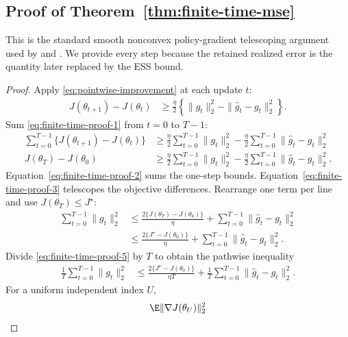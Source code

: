 \subsection{Proof of Theorem~\ref{thm:finite-time-mse}}

This is the standard smooth nonconvex policy-gradient telescoping argument used
by \citet{yuan2022general} and \citet{kallus2020efficient}.  We provide every
step because the retained realized error is the quantity later replaced by the
ESS bound.

\begin{proof}
Apply \eqref{eq:pointwise-improvement} at each update $t$:
\begin{align}
  J(\theta_{t+1})-J(\theta_t)
  &\ge\frac{\eta}{2}
    \left\{\|g_t\|_2^2-\|\widehat g_t-g_t\|_2^2\right\}.
    \label{eq:finite-time-proof-1}
\end{align}
Sum \eqref{eq:finite-time-proof-1} from $t=0$ to $T-1$:
\begin{align}
  \sum_{t=0}^{T-1}\{J(\theta_{t+1})-J(\theta_t)\}
  &\ge\frac{\eta}{2}\sum_{t=0}^{T-1}\|g_t\|_2^2
    -\frac{\eta}{2}\sum_{t=0}^{T-1}
      \|\widehat g_t-g_t\|_2^2
    \label{eq:finite-time-proof-2}\\
  J(\theta_T)-J(\theta_0)
  &\ge\frac{\eta}{2}\sum_{t=0}^{T-1}\|g_t\|_2^2
    -\frac{\eta}{2}\sum_{t=0}^{T-1}
      \|\widehat g_t-g_t\|_2^2.
    \label{eq:finite-time-proof-3}
\end{align}
Equation~\eqref{eq:finite-time-proof-2} sums the one-step bounds.
Equation~\eqref{eq:finite-time-proof-3} telescopes the objective differences.
Rearrange one term per line and use $J(\theta_T)\le J^\star$:
\begin{align}
  \sum_{t=0}^{T-1}\|g_t\|_2^2
  &\le\frac{2\{J(\theta_T)-J(\theta_0)\}}{\eta}
    +\sum_{t=0}^{T-1}\|\widehat g_t-g_t\|_2^2
    \label{eq:finite-time-proof-4}\\
  &\le\frac{2\{J^\star-J(\theta_0)\}}{\eta}
    +\sum_{t=0}^{T-1}\|\widehat g_t-g_t\|_2^2.
    \label{eq:finite-time-proof-5}
\end{align}
Divide \eqref{eq:finite-time-proof-5} by $T$ to obtain the pathwise inequality
\begin{align}
  \frac1T\sum_{t=0}^{T-1}\|g_t\|_2^2
  &\le
  \frac{2\{J^\star-J(\theta_0)\}}{\eta T}
  +\frac1T\sum_{t=0}^{T-1}\|\widehat g_t-g_t\|_2^2.
  \label{eq:finite-time-mse}
\end{align}
For a uniform independent index $U$,
\begin{align}
  \E\|\nabla J(\theta_U)\|_2^2

\end{align}
\end{proof}
